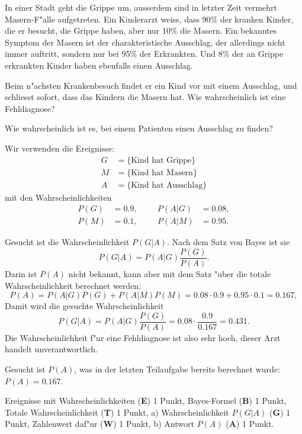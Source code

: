 In einer Stadt geht die Grippe um, ausserdem sind in letzter Zeit
vermehrt Masern-F"alle aufgetreten.
Ein Kinderarzt weiss, dass 90\% der kranken Kinder, die er besucht,
die Grippe haben, aber nur 10\% die Masern.
Ein bekanntes Symptom der Masern ist der charakteristische Ausschlag,
der allerdings nicht immer auftritt, sondern nur bei 95\% der Erkrankten.
Und 8\% der an Grippe erkrankten Kinder haben ebenfalls einen Ausschlag.
\begin{teilaufgaben}
\item
Beim n"achsten Krankenbesuch findet er ein Kind vor mit einem Ausschlag,
und schliesst sofort, dass das Kindern die Masern hat.
Wie wahrscheinlich ist eine Fehldiagnose?
\item
Wie wahrscheinlich ist es, bei einem Patienten einen Ausschlag zu finden?
\end{teilaufgaben}

\begin{loesung}
Wir verwenden die Ereignisse:
\begin{align*}
G&=\{\text{Kind hat Grippe}\}\\
M&=\{\text{Kind hat Masern}\}\\
A&=\{\text{Kind hat Ausschlag}\}
\end{align*}
mit den Wahrscheinlichkeiten
\[
\begin{aligned}
P(G)&=0.9,&&&P(A|G)&=0.08,\\
P(M)&=0.1,&&&P(A|M)&=0.95.
\end{aligned}
\]
\begin{teilaufgaben}
\item
Gesucht ist die Wahrscheinlichkeit $P(G|A)$.
Nach dem Satz von Bayes ist sie
\[
P(G|A)=P(A|G)\frac{P(G)}{P(A)}.
\]
Darin ist $P(A)$ nicht bekannt, kann aber mit dem Satz "uber die totale
Wahrscheinlichkeit berechnet werden:
\[
P(A)=P(A|G)P(G)+P(A|M)P(M)=0.08\cdot 0.9 + 0.95\cdot 0.1=0.167,
\]
Damit wird die gesuchte Wahrscheinlichkeit
\[
P(G|A)=P(A|G)\frac{P(G)}{P(A)}=0.08\cdot\frac{0.9}{0.167}=0.431.
\]
Die Wahrscheinlichkeit f"ur eine Fehldiagnose ist also sehr hoch,
dieser Arzt handelt unverantwortlich.
\item Gesucht ist $P(A)$, was in der letzten Teilaufgabe bereits
berechnet wurde: $P(A)=0.167$.
\qedhere
\end{teilaufgaben}
\end{loesung}

\begin{bewertung}
Ereignisse mit Wahrscheinlichkeiten ({\bf E}) 1 Punkt,
Bayes-Formel ({\bf B}) 1 Punkt,
Totale Wahrscheinlichkeit ({\bf T}) 1 Punkt,
a) Wahrscheinlichkeit $P(G|A)$ ({\bf G}) 1 Punkt, 
Zahlenwert daf"ur ({\bf W}) 1 Punkt,
b) Antwort $P(A)$ ({\bf A}) 1 Punkt.
\end{bewertung}




